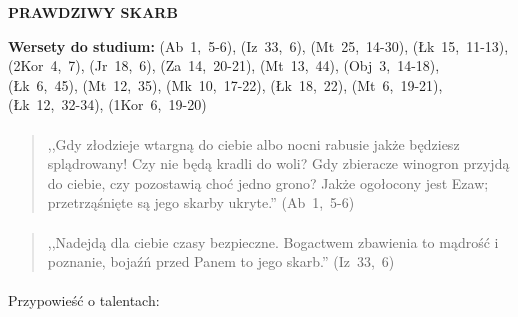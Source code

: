 \documentclass[10pt,a4paper,oneside]{article}
\begin{document}
\centerline{\textbf{\MakeUppercase{Prawdziwy skarb}}}
\begin{center}
\textbf{Wersety do studium:} 
\mbox{(Ab 1, 5-6)}, \mbox{(Iz 33, 6)}, \mbox{(Mt 25, 14-30)}, \mbox{(Łk 15, 11-13)}, \mbox{(2Kor 4, 7)}, \mbox{(Jr 18, 6)}, \mbox{(Za 14, 20-21)}, \mbox{(Mt 13, 44)}, \mbox{(Obj 3, 14-18)}, \mbox{(Łk 6, 45)}, \mbox{(Mt 12, 35)}, \mbox{(Mk 10, 17-22)}, \mbox{(Łk 18, 22)}, \mbox{(Mt 6, 19-21)}, \mbox{(Łk 12, 32-34)}, \mbox{(1Kor 6, 19-20)}
\end{center}
\paragraph{}
\begin{quote}
,,Gdy złodzieje wtargną do ciebie albo nocni rabusie jakże będziesz splądrowany! Czy nie będą kradli do woli? Gdy zbieracze winogron przyjdą do ciebie, czy pozostawią choć jedno grono? Jakże ogołocony jest Ezaw; przetrząśnięte są jego skarby ukryte.'' \mbox{(Ab 1, 5-6)}
\end{quote}
\paragraph{}
\begin{quote}
,,Nadejdą dla ciebie czasy bezpieczne. Bogactwem zbawienia to mądrość i poznanie, bojaźń przed Panem to jego skarb.'' \mbox{(Iz 33, 6)}
\end{quote}
\paragraph{}
Przypowieść o talentach:
\end{document}
